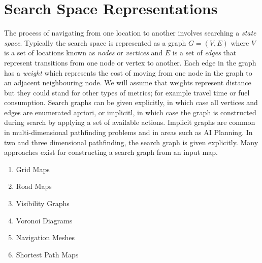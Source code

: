 \section{Search Space Representations}
The process of navigating from one location to another involves searching a
\emph{state space}.  Typically the search space is represented as a graph $G =
(V, E)$ where $V$ is a set of locations known as \emph{nodes} or \emph{vertices}
and $E$ is a set of \emph{edges} that represent transitions from one node or
vertex to another.  Each edge in the graph has a \emph{weight} which represents
the cost of moving from one node in the graph to an adjacent neighbouring node.
We will assume that weights represent distance but they could stand for other
types of metrics; for example travel time or fuel consumption.
Search graphs can be given explicitly, in which case all vertices and edges
are enumerated apriori, or implicitl, in which case the graph is constructed
during search by applying a set of available actions.
Implicit graphs are common in multi-dimensional pathfinding problems and in
areas such as AI Planning. In two and three dimensional pathfinding, the 
search graph is given explicitly.
Many approaches exist for constructing a search graph from an input map.

\begin{enumerate}
\item{Grid Maps}
\item{Road Maps}
\item{Visibility Graphs}
\item{Voronoi Diagrams}
\item{Navigation Meshes}
\item{Shortest Path Maps}
\end{enumerate}

